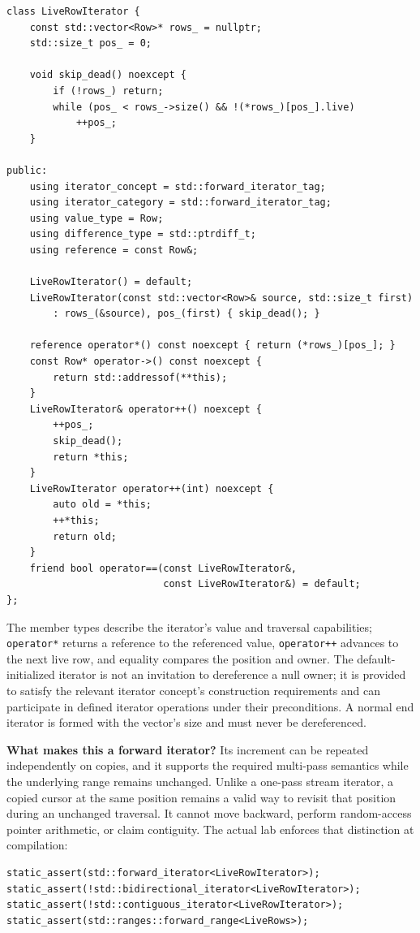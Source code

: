 \begin{verbatim}
class LiveRowIterator {
    const std::vector<Row>* rows_ = nullptr;
    std::size_t pos_ = 0;

    void skip_dead() noexcept {
        if (!rows_) return;
        while (pos_ < rows_->size() && !(*rows_)[pos_].live)
            ++pos_;
    }

public:
    using iterator_concept = std::forward_iterator_tag;
    using iterator_category = std::forward_iterator_tag;
    using value_type = Row;
    using difference_type = std::ptrdiff_t;
    using reference = const Row&;

    LiveRowIterator() = default;
    LiveRowIterator(const std::vector<Row>& source, std::size_t first)
        : rows_(&source), pos_(first) { skip_dead(); }

    reference operator*() const noexcept { return (*rows_)[pos_]; }
    const Row* operator->() const noexcept {
        return std::addressof(**this);
    }
    LiveRowIterator& operator++() noexcept {
        ++pos_;
        skip_dead();
        return *this;
    }
    LiveRowIterator operator++(int) noexcept {
        auto old = *this;
        ++*this;
        return old;
    }
    friend bool operator==(const LiveRowIterator&,
                           const LiveRowIterator&) = default;
};
\end{verbatim}

The member types describe the iterator's value and traversal capabilities; \texttt{operator*} returns a reference to the referenced value, \texttt{operator++} advances to the next live row, and equality compares the position and owner. The default-initialized iterator is not an invitation to dereference a null owner; it is provided to satisfy the relevant iterator concept's construction requirements and can participate in defined iterator operations under their preconditions. A normal end iterator is formed with the vector's size and must never be dereferenced.

\textbf{What makes this a forward iterator?} Its increment can be repeated independently on copies, and it supports the required multi-pass semantics while the underlying range remains unchanged. Unlike a one-pass stream iterator, a copied cursor at the same position remains a valid way to revisit that position during an unchanged traversal. It cannot move backward, perform random-access pointer arithmetic, or claim contiguity. The actual lab enforces that distinction at compilation:

\begin{verbatim}
static_assert(std::forward_iterator<LiveRowIterator>);
static_assert(!std::bidirectional_iterator<LiveRowIterator>);
static_assert(!std::contiguous_iterator<LiveRowIterator>);
static_assert(std::ranges::forward_range<LiveRows>);
\end{verbatim}

